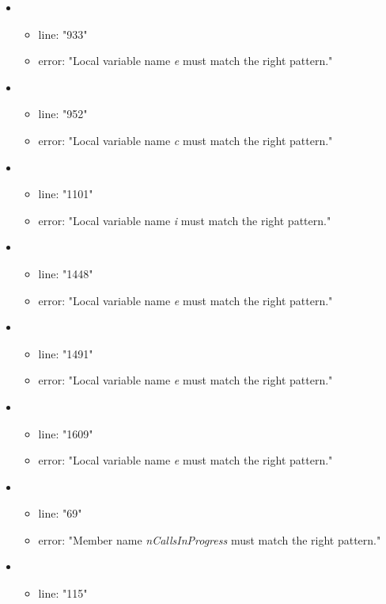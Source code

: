 \begin{itemize}
\begin{itemize}
	\end{itemize}
	\item 
	\begin{itemize} 
		\item line: "933" 
		\item error: "Local variable name \emph{e} must match the right pattern." 
	\end{itemize}
	\item 
	\begin{itemize} 
		\item line: "952" 
		\item error: "Local variable name \emph{c} must match the right pattern." 
	\end{itemize}
	\item 
	\begin{itemize} 
		\item line: "1101" 
		\item error: "Local variable name \emph{i} must match the right pattern." 
	\end{itemize}
	\item 
	\begin{itemize} 
		\item line: "1448" 
		\item error: "Local variable name \emph{e} must match the right pattern." 
	\end{itemize}
	\item 
	\begin{itemize} 
		\item line: "1491" 
		\item error: "Local variable name \emph{e} must match the right pattern." 
	\end{itemize}
	\item 
	\begin{itemize} 
		\item line: "1609" 
		\item error: "Local variable name \emph{e} must match the right pattern." 
	\end{itemize}
	\item 
	\begin{itemize} 
		\item line: "69" 
		\item error: "Member name \emph{nCallsInProgress} must match the right pattern." 
	\end{itemize}
	\item 
	\begin{itemize} 
		\item line: "115" 

\end{itemize}
\end{itemize}
